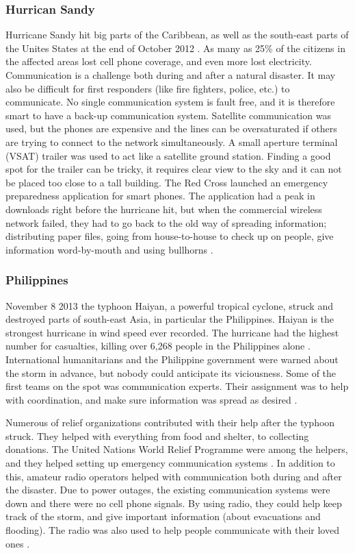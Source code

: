 \subsubsection{Hurrican Sandy}
Hurricane Sandy hit big parts of the Caribbean, as well as the south-east parts of the Unites States at the end of October 2012 \cite{WikiSandy}. As many as 25\% of the citizens in the affected areas lost cell phone coverage, and even more lost electricity. Communication is a challenge both during and after a natural disaster. It may also be difficult for first responders (like fire fighters, police, etc.) to communicate. No single communication system is fault free, and it is therefore smart to have a back-up communication system. Satellite communication was used, but the phones are expensive and the lines can be oversaturated if others are trying to connect to the network simultaneously. A small aperture terminal (VSAT) trailer was used to act like a satellite ground station. Finding a good spot for the trailer can be tricky, it requires clear view to the sky and it can not be placed too close to a tall building. The Red Cross launched an emergency preparedness application for smart phones. The application had a peak in downloads right before the hurricane hit, but when the commercial wireless network failed, they had to go back to the old way of spreading information; distributing paper files, going from house-to-house to check up on people, give information word-by-mouth and using bullhorns \cite{hurricaneSandy}.

\subsubsection{Philippines}
November 8 2013 the typhoon Haiyan, a powerful tropical cyclone, struck and destroyed parts of south-east Asia, in particular the Philippines. Haiyan is the strongest hurricane in wind speed ever recorded. The hurricane had the highest number for casualties, killing over 6,268 people in the Philippines alone \cite{wikiHaiyan}. International humanitarians and the Philippine government were warned about the storm in advance, but nobody could anticipate its viciousness. Some of the first teams on the spot was communication experts. Their assignment was to help with coordination, and make sure information was spread as desired \cite{disasterResponse}.

Numerous of relief organizations contributed with their help after the typhoon struck. They helped with everything from food and shelter, to collecting donations. The United Nations World Relief Programme were among the helpers, and they helped setting up emergency communication systems \cite{philippines}. In addition to this, amateur radio operators helped with communication both during and after the disaster. Due to power outages, the existing communication systems were down and there were no cell phone signals. By using radio, they could help keep track of the storm, and give important information (about evacuations and flooding). The radio was also used to help people communicate with their loved ones \cite{philippinesradio}. 



